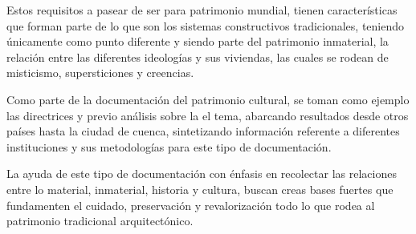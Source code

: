 Estos requisitos a pasear de ser para patrimonio mundial, tienen características que forman parte de lo que son los sistemas constructivos tradicionales, teniendo únicamente como punto diferente y siendo parte del patrimonio inmaterial, la relación entre las diferentes ideologías y sus viviendas, las cuales se rodean de misticismo, supersticiones y creencias.

Como parte de la documentación del patrimonio cultural, se toman como ejemplo las directrices y previo análisis sobre la el tema, abarcando resultados desde otros países hasta la ciudad de cuenca, sintetizando información referente a diferentes instituciones y sus metodologías para este tipo de documentación\citep{narvaez_metodologipara}.

La ayuda de este tipo de documentación con énfasis en recolectar las relaciones entre lo material, inmaterial, historia y cultura, buscan creas bases fuertes que fundamenten el cuidado, preservación y revalorización todo lo que rodea al patrimonio tradicional arquitectónico.

